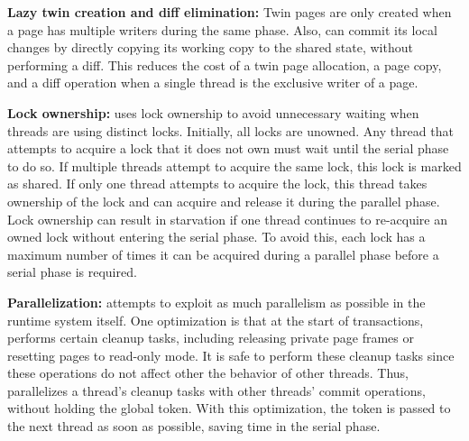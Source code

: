\textbf{Lazy twin creation and diff elimination: }
Twin pages are only created when a page has multiple writers during the same phase. Also, \dthreads{} can commit its local changes by directly copying its working copy to the shared state, without performing a diff. This reduces the cost of a twin page allocation, a page copy, and a diff operation when a single thread is the exclusive writer of a page.

\textbf{Lock ownership:} \dthreads{} uses lock ownership to avoid unnecessary waiting when threads are using distinct locks. Initially, all locks are unowned. Any thread that attempts to acquire a lock that it does not own must wait until the serial phase to do so. If multiple threads attempt to acquire the same lock, this lock is marked as shared. If only one thread attempts to acquire the lock, this thread takes ownership of the lock and can acquire and release
it during the parallel phase. Lock ownership can result in starvation if one thread continues to re-acquire an owned lock without entering the serial phase. To avoid this, each lock has a maximum number of times it can be acquired during a parallel phase before a serial phase is required.

\textbf{Parallelization: }
\dthreads{} attempts to exploit as much parallelism as possible in the runtime system itself. One optimization is that at the start of transactions, \dthreads{} performs certain cleanup tasks, including releasing private page frames or resetting pages to read-only mode. It is safe to perform these cleanup tasks since these operations do not affect other the behavior of other threads.
Thus, \dthreads{} parallelizes a thread's cleanup tasks with other threads’ commit operations, without holding the global token. With this optimization, the token is passed to the next thread as soon as possible, saving time in the serial phase. 